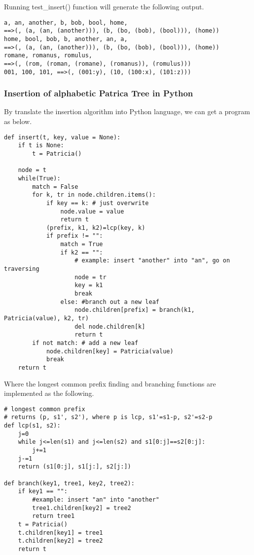 \documentclass{article}
\begin{document}
Running test\_insert() function will generate the following output.

\begin{verbatim}
a, an, another, b, bob, bool, home,
==>(, (a, (an, (another))), (b, (bo, (bob), (bool))), (home))
home, bool, bob, b, another, an, a,
==>(, (a, (an, (another))), (b, (bo, (bob), (bool))), (home))
romane, romanus, romulus,
==>(, (rom, (roman, (romane), (romanus)), (romulus)))
001, 100, 101, ==>(, (001:y), (10, (100:x), (101:z)))
\end{verbatim}

\subsubsection*{Insertion of alphabetic Patrica Tree in Python}
By translate the insertion algorithm into Python language, we can get a
program as below.

\lstset{language=Python}
\begin{lstlisting}
def insert(t, key, value = None):
    if t is None:
        t = Patricia()

    node = t
    while(True):
        match = False
        for k, tr in node.children.items():
            if key == k: # just overwrite
                node.value = value
                return t
            (prefix, k1, k2)=lcp(key, k)
            if prefix != "":
                match = True
                if k2 == "":
                    # example: insert "another" into "an", go on traversing
                    node = tr
                    key = k1
                    break
                else: #branch out a new leaf
                    node.children[prefix] = branch(k1, Patricia(value), k2, tr)
                    del node.children[k]
                    return t
        if not match: # add a new leaf
            node.children[key] = Patricia(value)
            break
    return t
\end{lstlisting}

Where the longest common prefix finding and branching functions are implemented
as the following.

\begin{lstlisting}
# longest common prefix
# returns (p, s1', s2'), where p is lcp, s1'=s1-p, s2'=s2-p
def lcp(s1, s2):
    j=0
    while j<=len(s1) and j<=len(s2) and s1[0:j]==s2[0:j]:
        j+=1
    j-=1
    return (s1[0:j], s1[j:], s2[j:])

def branch(key1, tree1, key2, tree2):
    if key1 == "":
        #example: insert "an" into "another"
        tree1.children[key2] = tree2
        return tree1
    t = Patricia()
    t.children[key1] = tree1
    t.children[key2] = tree2
    return t
\end{lstlisting}
\end{document}
